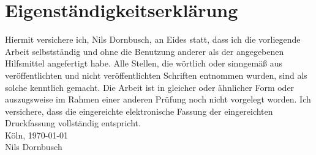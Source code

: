 \documentclass[12pt,a4paper]{scrartcl}
\numberwithin{equation}{section} %
\theoremstyle{definition}
\theoremstyle{plain}
\begin{document}
\section*{Eigenständigkeitserklärung}
Hiermit versichere ich, Nils Dornbusch, an Eides statt, dass ich die vorliegende Arbeit selbstständig und ohne die Benutzung anderer als der angegebenen Hilfsmittel angefertigt habe. Alle Stellen, die wörtlich oder sinngemäß aus veröffentlichten und nicht veröffentlichten Schriften entnommen wurden, sind als solche kenntlich gemacht. Die Arbeit ist in gleicher oder ähnlicher Form oder auszugsweise im Rahmen einer anderen Prüfung noch nicht vorgelegt worden. Ich versichere, dass die eingereichte elektronische Fassung der eingereichten Druckfassung vollständig entspricht.
\\[\bigskipamount]
Köln, \today
\\[2\bigskipamount]
Nils Dornbusch
\end{document}
